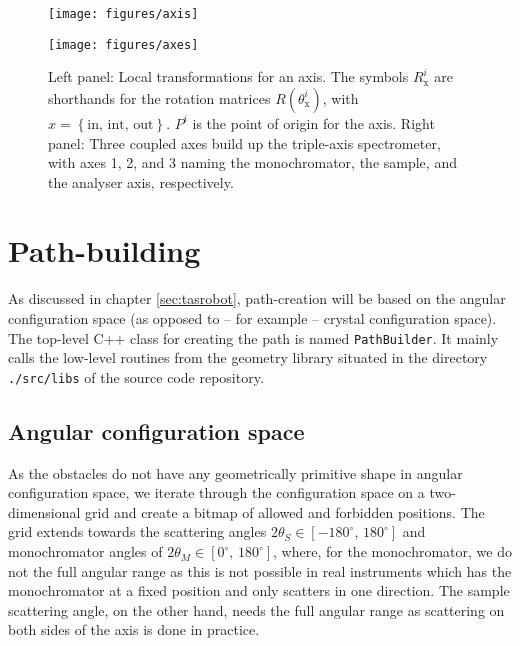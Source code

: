 \begin{figure*}
	\begin{minipage}{0.45 \textwidth}
		\begin{center}
			\texttt{[image: figures/axis]}
		\end{center}
	\end{minipage}
	\begin{minipage}{0.45 \textwidth}
		\begin{center}
			\texttt{[image: figures/axes]}
		\end{center}
	\end{minipage}
	\caption{Left panel: Local transformations for an axis. The symbols $R_{\mathrm{x}}^i$ are shorthands
	for the rotation matrices $R\left( \theta_{\mathrm{x}}^i \right)$, with $x = \left\{ \mathrm{in,\, int,\, out} \right\}$.
	$P^i$ is the point of origin for the axis.
	Right panel: Three coupled axes build up the triple-axis spectrometer, with axes 1, 2, and 3 naming the monochromator,
	the sample, and the analyser axis, respectively.
	\label{fig:tas_axes}}
\end{figure*}






\section{Path-building}
\label{sec:buildpath}

As discussed in chapter \ref{sec:tasrobot}, path-creation will be based on the angular configuration space
(as opposed to -- for example -- crystal configuration space). The top-level C++ class for creating the path
is named \lstinline[language=C++]|PathBuilder|. It mainly calls the low-level routines from the geometry
library situated in the directory \lstinline|./src/libs| of the source code repository.


\subsection{Angular configuration space}
As the obstacles do not have any geometrically primitive shape in angular configuration space, we iterate
through the configuration space on a two-dimensional grid and create a bitmap of allowed and forbidden
positions. The grid extends towards the scattering angles $2\theta_S \in \left[ -180^{\circ},\, 180^{\circ} \right]$
and monochromator angles of $2\theta_M \in \left[0^{\circ},\, 180^{\circ} \right]$, where, for the monochromator, we do
not the full angular range as this is not possible in real instruments which has the monochromator at a fixed position
and only scatters in one direction. The sample scattering angle, on the other hand, needs the full angular range as
scattering on both sides of the axis is done in practice.


